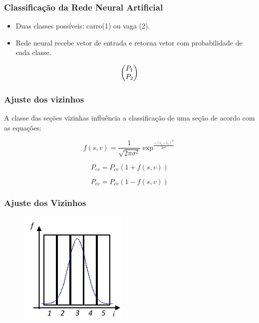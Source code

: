 \documentclass{beamer}
\begin{document}
\begin{frame}
\frametitle{Classificação da Rede Neural Artificial}
   \begin{itemize}
   \item Duas classes possíveis: carro(1) ou vaga (2).
   \item Rede neural recebe vetor de entrada e retorna vetor com probabilidade de cada classe.
   \end{itemize}
  \begin{equation}
	\centering	
	\begin{pmatrix}
	P_1\\P_2
	\end{pmatrix}  
	\centering
  \end{equation}

\end{frame}

\begin{frame}
\frametitle{Ajuste dos vizinhos}

A classe das seções vizinhas influência a classificação de uma seção de acordo com as equações:

   \begin{equation}
	f(s,v) = \frac{1}{\sqrt{2\pi\sigma^2}} \exp^{\frac{-(i_s-i_v)^2}{2\sigma^2}} 
	\end{equation}

\begin{equation}
	P_{cv}  = P_{cv}(1+f(s,v))
\end{equation}

\begin{equation}
	P_{\overline{cv}}  = P_{\overline{cv}}(1-f(s,v))
\end{equation}
\end{frame}

\begin{frame}
\frametitle{Ajuste dos Vizinhos}
  \begin{figure}
	\centering
	\includegraphics[width=.4\textwidth]{Influencia}
	\centering
\end{figure}
\end{frame}
\end{document}

